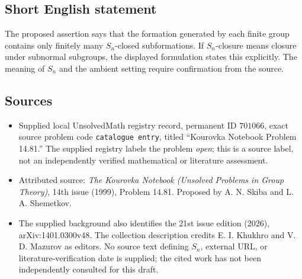 \documentclass[11pt]{article}
\begin{document}
\subsection{Short English statement}
The proposed assertion says that the formation generated by each finite group contains only finitely many \(S_n\)-closed subformations. If \(S_n\)-closure means closure under subnormal subgroups, the displayed formulation states this explicitly. The meaning of \(S_n\) and the ambient setting require confirmation from the source.
\subsection{Sources}
\begin{itemize}
\item Supplied local UnsolvedMath registry record, permanent ID \(701066\), exact source problem code \texttt{catalogue entry}, titled ``Kourovka Notebook Problem 14.81.'' The supplied registry labels the problem \emph{open}; this is a source label, not an independently verified mathematical or literature assessment.
\item Attributed source: \emph{The Kourovka Notebook (Unsolved Problems in Group Theory)}, 14th issue (1999), Problem 14.81. Proposed by A. N. Skiba and L. A. Shemetkov.
\item The supplied background also identifies the 21st issue edition (2026), arXiv:1401.0300v48. The collection description credits E. I. Khukhro and V. D. Mazurov as editors. No source text defining \(S_n\), external URL, or literature-verification date is supplied; the cited work has not been independently consulted for this draft.
\end{itemize}
\end{document}
